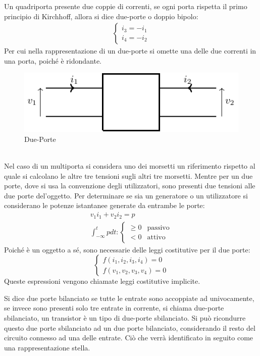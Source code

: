 \documentclass{article}
\numberwithin{equation}{subsection}
\begin{document}
Un quadriporta presente due coppie di correnti, se ogni porta rispetta il primo principio di Kirchhoff, allora si dice due-porte o doppio bipolo:
\begin{gather*}
    \begin{cases}
        i_3=-i_1\\
        i_4=-i_2
    \end{cases}
\end{gather*}
Per cui nella rappresentazione di un due-porte si omette una delle due correnti in una porta, poiché è ridondante. 
\begin{figure}[ht]%
    \centering
    \includegraphics{due-porte-generico.pdf}
    \caption{Due-Porte}
    \label{fig:due-porte}
\end{figure}
\\
Nel caso di un multiporta si considera uno dei morsetti un riferimento rispetto al quale si calcolano le altre tre tensioni sugli altri tre morsetti. 
Mentre per un due porte, dove si usa la convenzione degli utilizzatori, 
sono presenti due tensioni alle due porte del'oggetto. Per determinare se sia un generatore o un utilizzatore si considerano 
le potenze istantanee generate da entrambe le porte:
\begin{gather*}
    v_1i_1+v_2i_2=p\\
    \displaystyle\int_{-\infty}^tp dt:\begin{cases}
        \geq0&\mbox{passivo}\\
        <0&\mbox{attivo}
    \end{cases}
\end{gather*} 
Poiché è un oggetto a sé, sono necessarie delle leggi costitutive per il due porte:
\begin{equation*}
    \begin{cases}
        f(i_1,i_2,i_3,i_4)=0\\
        f(v_1,v_2,v_3,v_4)=0
    \end{cases}
\end{equation*}
Queste espressioni vengono chiamate leggi costitutive implicite. 


Si dice due porte bilanciato se tutte le entrate sono accoppiate ad univocamente, se invece sono presenti solo tre entrate in corrente, si chiama due-porte sbilanciato, 
un transistor è un tipo di due-porte sbilanciato. Si può ricondurre questo due porte sbilanciato ad un due porte bilanciato, considerando il resto del circuito connesso 
ad una delle entrate. Ciò che verrà identificato in seguito come una rappresentazione stella. 
\end{document}
